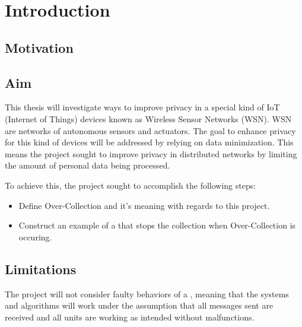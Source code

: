 \chapter{Introduction}

\section{Motivation}

\section{Aim}



This thesis will investigate ways to improve privacy in a special kind of IoT (Internet of Things) devices known as Wireless Sensor Networks (WSN). WSN are networks of autonomous sensors and actuators. The goal to enhance privacy for this kind of devices will be addressed by relying on data minimization. This means the project sought to improve privacy in distributed networks by limiting the amount of personal data being processed.

To achieve this, the project sought to accomplish the following steps:

\begin{itemize}
\item Define Over-Collection and it's meaning with regards to this project. 
\item Construct an example of a \wsn that stops the collection when Over-Collection is occuring.
\end{itemize}


\section{Limitations}

The project will not consider faulty behaviors of a \wsn, meaning that the systems and algorithms will work under the assumption that all messages sent are received and all units are working as intended without malfunctions.

